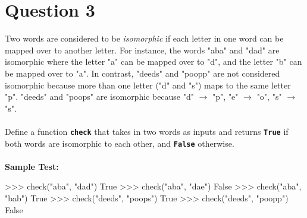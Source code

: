 \section{Question 3}
Two words are considered to be \textit{isomorphic} if each letter in one word can be mapped
over to another letter. For instance, the words "aba" and "dad" are isomorphic where the
letter "a" can be mapped over to "d", and the letter "b" can be mapped over to "a". In
contrast, "deeds" and "poopp" are not considered isomorphic because more than one
letter ("d" and "s") maps to the same letter "p". "deeds" and "poops" are isomorphic
because "d" $\rightarrow$ "p", "e" $\rightarrow$ "o", "s" $\rightarrow$ "s". \\ \\
Define a function \texttt{\bfseries check} that takes in two words as inputs and returns \texttt{\bfseries True} if both
words are isomorphic to each other, and \texttt{\bfseries False} otherwise. \\ \\
\textbf{Sample Test:}
\begin{python}
>>> check("aba", "dad")
True
>>> check("aba", "dae")
False
>>> check("aba", "bab")
True
>>> check("deeds", "poops")
True
>>> check("deeds", "poopp")
False
\end{python}

\newpage

